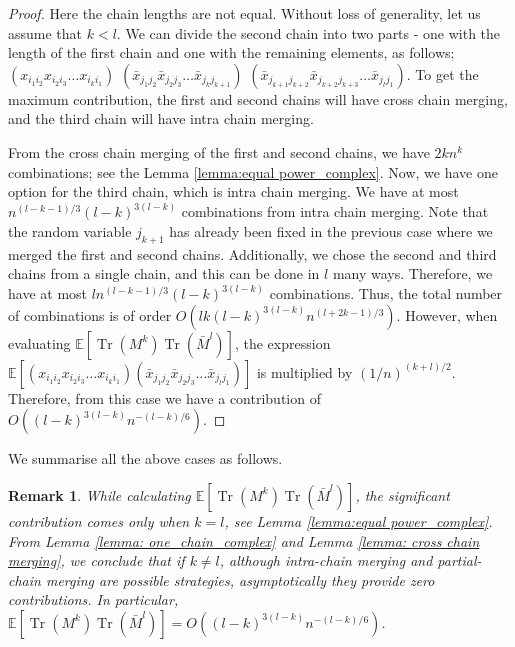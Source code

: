 \documentclass[12pt]{amsart}
\theoremstyle{plain}
\newtheorem{rem}[Thm]{Remark}
\theoremstyle{definition}
\newcommand{\Tr}{\operatorname{Tr}}
\begin{document}
\begin{proof}
Here the chain lengths are not equal. Without loss of generality, let us assume that $k < l$. 
We can divide the second chain into two parts - one with the length of the first chain and one with the remaining elements, as follows;
$(x_{i_{1}i_{2}}x_{i_{2}i_{3}}\dots x_{i_{k}i_{1}})$ $(\bar{x}_{j_{1}j_{2}}\bar{x}_{j_{2}j_{3}}\dots \bar{x}_{j_{k}j_{k+1}})$ $(\bar{x}_{j_{k+1}j_{k+2}} \bar{x}_{j_{k+2}j_{k+3}}\dots \bar{x}_{j_{l}j_{1}})$. To get the maximum contribution, the first and second chains will have cross chain merging, and the third chain will have intra chain merging.

From the cross chain merging of the first and second chains, we have $2kn^k$ combinations; see the Lemma \ref{lemma:equal power_complex}. Now, we have one option for the third chain, which is intra chain merging. We have at most $n^{(l-k-1)/3}(l-k)^{3(l-k)}$ combinations from intra chain merging. Note that the random variable $j_{k+1}$ has already been fixed in the previous case where we merged the first and second chains. Additionally, we chose the second and third chains from a single chain, and this can be done in $l$ many ways. Therefore, we have at most $ln^{(l-k-1)/3}(l-k)^{3(l-k)}$ combinations. Thus, the total number of combinations is of order $O(lk(l-k)^{3(l-k)}n^{(l+2k-1)/3})$. However, when evaluating $\mathbb{E}[\Tr(M^{k})\Tr(\bar{M}^{l})]$, the expression $\mathbb{E}\left[(x_{i_{1}i_{2}}x_{i_{2}i_{3}}\dots x_{i_{k}i_{1}})(\bar x_{j_{1}j_{2}}\bar x_{j_{2}j_{3}}\dots \bar x_{j_{l}j_{1}})\right]$ is multiplied by $(1/n)^{(k+l)/2}$. Therefore, from this case we have a contribution of $O((l-k)^{3(l-k)}n^{-(l-k)/6})$.
\end{proof}




We summarise all the above cases as follows.


\begin{rem}{\label{rem: intra and partial chain merging}}
    While calculating $\mathbb{E}[\Tr(M^{k})\Tr(\bar{M}^{l})]$, the significant contribution comes only when $k = l$, see Lemma \ref{lemma:equal power_complex}. From Lemma \ref{lemma: one_chain_complex} and Lemma \ref{lemma: cross chain merging}, we conclude that if $k \neq l$, although intra-chain merging and partial-chain merging are possible strategies, asymptotically they provide zero contributions. In particular, $\mathbb{E}[\Tr(M^{k})\Tr(\bar{M}^{l})] = O((l-k)^{3(l-k)}n^{-(l-k)/6})$.

\end{rem}
\end{document}
